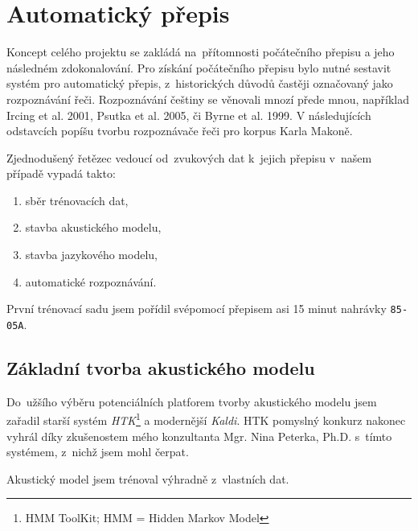 \chapter{Automatický přepis}
\label{kap:asr}


Koncept celého projektu se zakládá na~přítomnosti počátečního přepisu a jeho
následném zdokonalování. Pro získání počátečního přepisu bylo nutné sestavit
systém pro automatický přepis, z~historických důvodů častěji označovaný jako
rozpoznávání řeči. Rozpoznávání češtiny se věnovali mnozí přede mnou,
například Ircing et al. 2001\cite{ircing2001large}, Psutka et al.
2005\cite{psutka2005automatic}, či Byrne et al. 1999\cite{byrne1999large}.
V následujících odstavcích popíšu tvorbu rozpoznávače řeči pro korpus Karla
Makoně.

Zjednodušený řetězec vedoucí od~zvukových dat k~jejich přepisu v~našem případě
vypadá takto:\begin{enumerate}
\item{sběr trénovacích dat,}
\item{stavba akustického modelu,}
\item{stavba jazykového modelu,}
\item{automatické rozpoznávání.}
\end{enumerate}

První trénovací sadu jsem pořídil svépomocí přepisem asi 15 minut nahrávky
\texttt{85-05A}.

\section{Základní tvorba akustického modelu}

Do~užšího výběru potenciálních platforem tvorby akustického modelu jsem zařadil
starší systém \textit{HTK}\footnote{HMM ToolKit; HMM = Hidden Markov Model}\cite{young2002htk} a
modernější \textit{Kaldi}\cite{povey2011kaldi}. HTK pomyslný konkurz nakonec vyhrál díky zkušenostem
mého konzultanta Mgr. Nina Peterka, Ph.D. s~tímto systémem, z~nichž jsem mohl
čerpat.

Akustický model jsem trénoval výhradně z~vlastních dat.

